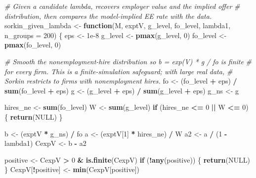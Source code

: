 \documentclass[
]{article}
\newenvironment{Shaded}{\begin{snugshade}}{\end{snugshade}}
\newcommand{\AttributeTok}[1]{\textcolor[rgb]{0.13,0.29,0.53}{#1}}
\newcommand{\CommentTok}[1]{\textcolor[rgb]{0.56,0.35,0.01}{\textit{#1}}}
\newcommand{\ConstantTok}[1]{\textcolor[rgb]{0.56,0.35,0.01}{#1}}
\newcommand{\ControlFlowTok}[1]{\textcolor[rgb]{0.13,0.29,0.53}{\textbf{#1}}}
\newcommand{\DecValTok}[1]{\textcolor[rgb]{0.00,0.00,0.81}{#1}}
\newcommand{\FloatTok}[1]{\textcolor[rgb]{0.00,0.00,0.81}{#1}}
\newcommand{\FunctionTok}[1]{\textcolor[rgb]{0.13,0.29,0.53}{\textbf{#1}}}
\newcommand{\NormalTok}[1]{#1}
\newcommand{\OtherTok}[1]{\textcolor[rgb]{0.56,0.35,0.01}{#1}}
\newcommand{\SpecialCharTok}[1]{\textcolor[rgb]{0.81,0.36,0.00}{\textbf{#1}}}
\begin{document}
\begin{Shaded}
\begin{Highlighting}[]
\CommentTok{\# Given a candidate lambda, recovers employer value and the implied offer}
\CommentTok{\# distribution, then compares the model{-}implied EE rate with the data.}
\NormalTok{sorkin\_given\_lambda }\OtherTok{\textless{}{-}} \ControlFlowTok{function}\NormalTok{(M, exptV, g\_level, fo\_level, lambda1, }\AttributeTok{n\_groups =} \DecValTok{200}\NormalTok{) \{}
\NormalTok{    eps }\OtherTok{\textless{}{-}} \FloatTok{1e{-}8}
\NormalTok{    g\_level }\OtherTok{\textless{}{-}} \FunctionTok{pmax}\NormalTok{(g\_level, }\DecValTok{0}\NormalTok{)}
\NormalTok{    fo\_level }\OtherTok{\textless{}{-}} \FunctionTok{pmax}\NormalTok{(fo\_level, }\DecValTok{0}\NormalTok{)}

    \CommentTok{\# Smooth the nonemployment{-}hire distribution so b = exp(V) * g / fo is finite}
    \CommentTok{\# for every firm. This is a finite{-}simulation safeguard; with large real data,}
    \CommentTok{\# Sorkin restricts to firms with nonemployment hires.}
\NormalTok{    fo }\OtherTok{\textless{}{-}}\NormalTok{ (fo\_level }\SpecialCharTok{+}\NormalTok{ eps) }\SpecialCharTok{/} \FunctionTok{sum}\NormalTok{(fo\_level }\SpecialCharTok{+}\NormalTok{ eps)}
\NormalTok{    g }\OtherTok{\textless{}{-}}\NormalTok{ (g\_level }\SpecialCharTok{+}\NormalTok{ eps) }\SpecialCharTok{/} \FunctionTok{sum}\NormalTok{(g\_level }\SpecialCharTok{+}\NormalTok{ eps)}
\NormalTok{    g\_ns }\OtherTok{\textless{}{-}}\NormalTok{ g}

\NormalTok{    hires\_ne }\OtherTok{\textless{}{-}} \FunctionTok{sum}\NormalTok{(fo\_level)}
\NormalTok{    W }\OtherTok{\textless{}{-}} \FunctionTok{sum}\NormalTok{(g\_level)}
    \ControlFlowTok{if}\NormalTok{ (hires\_ne }\SpecialCharTok{\textless{}=} \DecValTok{0} \SpecialCharTok{||}\NormalTok{ W }\SpecialCharTok{\textless{}=} \DecValTok{0}\NormalTok{) \{}
        \FunctionTok{return}\NormalTok{(}\ConstantTok{NULL}\NormalTok{)}
\NormalTok{    \}}

\NormalTok{    b }\OtherTok{\textless{}{-}}\NormalTok{ (exptV }\SpecialCharTok{*}\NormalTok{ g\_ns) }\SpecialCharTok{/}\NormalTok{ fo}
\NormalTok{    a }\OtherTok{\textless{}{-}}\NormalTok{ (exptV[}\DecValTok{1}\NormalTok{] }\SpecialCharTok{*}\NormalTok{ hires\_ne) }\SpecialCharTok{/}\NormalTok{ W}
\NormalTok{    a2 }\OtherTok{\textless{}{-}}\NormalTok{ a }\SpecialCharTok{/}\NormalTok{ (}\DecValTok{1} \SpecialCharTok{{-}}\NormalTok{ lambda1)}
\NormalTok{    CexpV }\OtherTok{\textless{}{-}}\NormalTok{ b }\SpecialCharTok{{-}}\NormalTok{ a2}

\NormalTok{    positive }\OtherTok{\textless{}{-}}\NormalTok{ CexpV }\SpecialCharTok{\textgreater{}} \DecValTok{0} \SpecialCharTok{\&} \FunctionTok{is.finite}\NormalTok{(CexpV)}
    \ControlFlowTok{if}\NormalTok{ (}\SpecialCharTok{!}\FunctionTok{any}\NormalTok{(positive)) \{}
        \FunctionTok{return}\NormalTok{(}\ConstantTok{NULL}\NormalTok{)}
\NormalTok{    \}}
\NormalTok{    CexpV[}\SpecialCharTok{!}\NormalTok{positive] }\OtherTok{\textless{}{-}} \FunctionTok{min}\NormalTok{(CexpV[positive])}


\end{Highlighting}
\end{Shaded}
\end{document}
